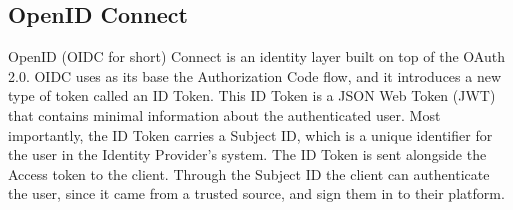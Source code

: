 


\subsection{OpenID Connect}
\label{cha:relatedwork:OAuth:openid}


OpenID (OIDC for short) Connect is an identity layer built on top of the OAuth 2.0.
%
OIDC uses as its base the Authorization Code flow, 
and it introduces a new type of token called an ID Token.
This ID Token is a JSON Web Token (JWT) that contains minimal information about the authenticated
user.
Most importantly, the ID Token carries a Subject ID, which is a unique identifier
for the user in the Identity Provider's system.
The ID Token is sent alongside the Access token to the client.
Through the Subject ID the client can authenticate the user, since it came from a trusted
source, and sign them in to their platform.



